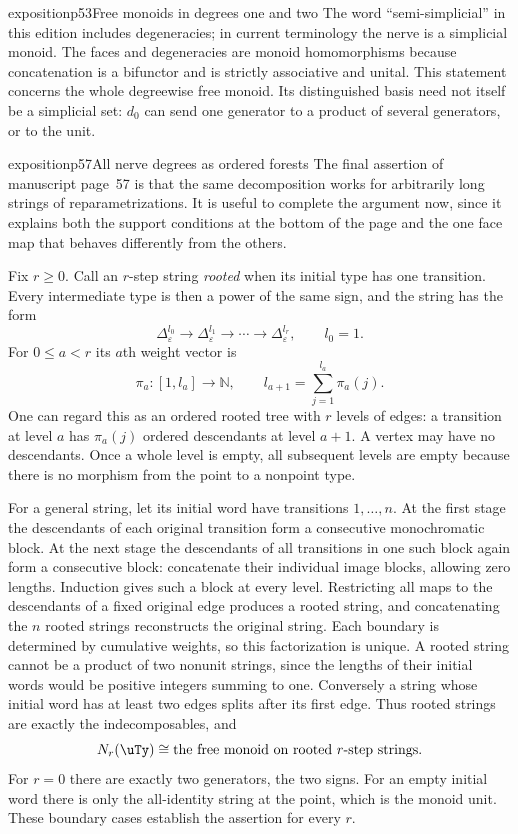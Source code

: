 \begin{dcomment}{exposition}{p53}{Free monoids in degrees one and two}
The word ``semi-simplicial'' in this edition includes degeneracies; in current terminology the nerve is a simplicial monoid. The faces and degeneracies are monoid homomorphisms because concatenation is a bifunctor and is strictly associative and unital. This statement concerns the whole degreewise free monoid. Its distinguished basis need not itself be a simplicial set: $d_0$ can send one generator to a product of several generators, or to the unit.
\end{dcomment}

\begin{dcomment}{exposition}{p57}{All nerve degrees as ordered forests}
The final assertion of manuscript page~57 is that the same decomposition works for arbitrarily long strings of reparametrizations. It is useful to complete the argument now, since it explains both the support conditions at the bottom of the page and the one face map that behaves differently from the others.

Fix $r\geq0$. Call an $r$-step string \emph{rooted} when its initial type has one transition. Every intermediate type is then a power of the same sign, and the string has the form
\[
 \Delta_\varepsilon^{l_0}\longrightarrow
 \Delta_\varepsilon^{l_1}\longrightarrow\cdots\longrightarrow
 \Delta_\varepsilon^{l_r},\qquad l_0=1.
\]
For $0\leq a<r$ its $a$th weight vector is
\[
 \pi_a:[1,l_a]\longrightarrow\mathbb N,
 \qquad l_{a+1}=\sum_{j=1}^{l_a}\pi_a(j).
\]
One can regard this as an ordered rooted tree with $r$ levels of edges: a transition at level $a$ has $\pi_a(j)$ ordered descendants at level $a+1$. A vertex may have no descendants. Once a whole level is empty, all subsequent levels are empty because there is no morphism from the point to a nonpoint type.

For a general string, let its initial word have transitions $1,\ldots,n$. At the first stage the descendants of each original transition form a consecutive monochromatic block. At the next stage the descendants of all transitions in one such block again form a consecutive block: concatenate their individual image blocks, allowing zero lengths. Induction gives such a block at every level. Restricting all maps to the descendants of a fixed original edge produces a rooted string, and concatenating the $n$ rooted strings reconstructs the original string. Each boundary is determined by cumulative weights, so this factorization is unique. A rooted string cannot be a product of two nonunit strings, since the lengths of their initial words would be positive integers summing to one. Conversely a string whose initial word has at least two edges splits after its first edge. Thus rooted strings are exactly the indecomposables, and
\[
 N_r(\uTy)\cong\text{the free monoid on rooted $r$-step strings}.
\]
For $r=0$ there are exactly two generators, the two signs. For an empty initial word there is only the all-identity string at the point, which is the monoid unit. These boundary cases establish the assertion for every $r$.


\end{dcomment}
